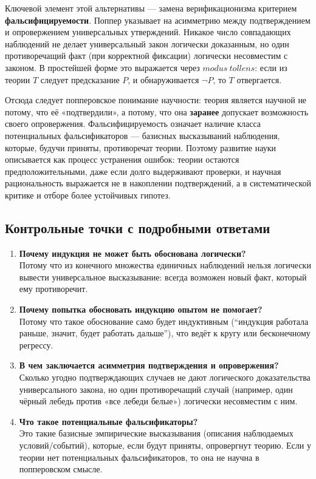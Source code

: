 \documentclass[a4paper,12pt]{article}
\begin{document}
Ключевой элемент этой альтернативы --- замена верификационизма критерием \textbf{фальсифицируемости}. Поппер указывает на асимметрию между подтверждением и опровержением универсальных утверждений. Никакое число совпадающих наблюдений не делает универсальный закон логически доказанным, но один противоречащий факт (при корректной фиксации) логически несовместим с законом. В простейшей форме это выражается через $modus\ tollens$: если из теории $T$ следует предсказание $P$, и обнаруживается $\neg P$, то $T$ отвергается.

Отсюда следует попперовское понимание научности: теория является научной не потому, что её «подтвердили», а потому, что она \textbf{заранее} допускает возможность своего опровержения. Фальсифицируемость означает наличие класса потенциальных фальсификаторов --- базисных высказываний наблюдения, которые, будучи приняты, противоречат теории. Поэтому развитие науки описывается как процесс устранения ошибок: теории остаются предположительными, даже если долго выдерживают проверки, и научная рациональность выражается не в накоплении подтверждений, а в систематической критике и отборе более устойчивых гипотез.

\subsection{Контрольные точки с подробными ответами}

\begin{enumerate}
    \item \textbf{Почему индукция не может быть обоснована логически?}\\
    Потому что из конечного множества единичных наблюдений нельзя логически вывести универсальное высказывание: всегда возможен новый факт, который ему противоречит.
    \item \textbf{Почему попытка обосновать индукцию опытом не помогает?}\\
    Потому что такое обоснование само будет индуктивным (``индукция работала раньше, значит, будет работать дальше''), что ведёт к кругу или бесконечному регрессу.
    \item \textbf{В чем заключается асимметрия подтверждения и опровержения?}\\
    Сколько угодно подтверждающих случаев не дают логического доказательства универсального закона, но один противоречащий случай (например, один чёрный лебедь против «все лебеди белые») логически несовместим с ним.
    \item \textbf{Что такое потенциальные фальсификаторы?}\\
    Это такие базисные эмпирические высказывания (описания наблюдаемых условий/событий), которые, если будут приняты, опровергнут теорию. Если у теории нет потенциальных фальсификаторов, то она не научна в попперовском смысле.
\end{enumerate}
\end{document}
